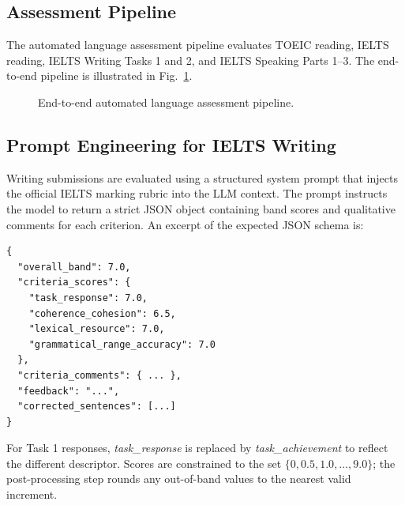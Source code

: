 \documentclass[conference]{IEEEtran}
\begin{document}
\subsection{Assessment Pipeline}
The automated language assessment pipeline evaluates TOEIC reading, IELTS reading, IELTS Writing Tasks 1 and 2, and IELTS Speaking Parts 1--3. The end-to-end pipeline is illustrated in Fig.~\ref{fig:pipeline}.

\begin{figure}[!t]
\centering
{}
\caption{End-to-end automated language assessment pipeline.}
\label{fig:pipeline}
\end{figure}

\subsection{Prompt Engineering for IELTS Writing}
Writing submissions are evaluated using a structured system prompt that injects the official IELTS marking rubric into the LLM context. The prompt instructs the model to return a strict JSON object containing band scores and qualitative comments for each criterion. An excerpt of the expected JSON schema is:

\begin{verbatim}
{
  "overall_band": 7.0,
  "criteria_scores": {
    "task_response": 7.0,
    "coherence_cohesion": 6.5,
    "lexical_resource": 7.0,
    "grammatical_range_accuracy": 7.0
  },
  "criteria_comments": { ... },
  "feedback": "...",
  "corrected_sentences": [...]
}
\end{verbatim}

For Task 1 responses, \textit{task\_response} is replaced by \textit{task\_achievement} to reflect the different descriptor. Scores are constrained to the set $\{0, 0.5, 1.0, \ldots, 9.0\}$; the post-processing step rounds any out-of-band values to the nearest valid increment.
\end{document}
